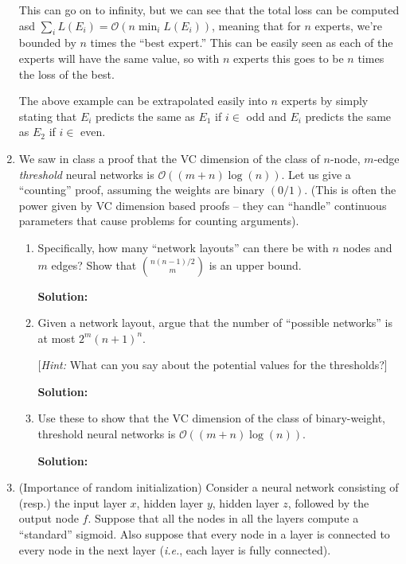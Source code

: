 \documentclass[12pt]{article}
\newcommand{\BigO}[1]{\mathcal{O}\left( #1 \right)}
\begin{document}
\begin{enumerate}
This can go on to infinity, but we can see that the total loss can be computed asd $\sum_{i}L(E_{i}) = \BigO{n \min_{i}L(E_{i})}$, meaning that for $n$ experts, we're bounded by $n$ times the ``best expert.'' This can be easily seen as each of the experts will have the same value, so with $n$ experts this goes to be $n$ times the loss of the best.

The above example can be extrapolated easily into $n$ experts by simply stating that $E_{i}$ predicts the same as $E_{1}$ if $i \in $ odd and $E_{i}$ predicts the same as $E_{2}$ if $i \in $ even.

\newpage

\item We saw in class a proof that the VC dimension of the class of $n$-node, $m$-edge {\em threshold} neural networks is $\BigO{(m+n)\log(n)}$. Let us give a ``counting'' proof, assuming the weights are binary $(0/1)$. (This is often the power given by VC dimension based proofs -- they can ``handle'' continuous parameters that cause problems for counting arguments).

\begin{enumerate}
  \item Specifically, how many ``network layouts'' can there be with $n$ nodes and $m$ edges? Show that ${n(n-1)/2}\choose{m}$ is an upper bound.

   {\bf Solution:}

   \item Given a network layout, argue that the number of ``possible networks'' is at most $2^{m}(n+1)^{n}$. 

[{\em Hint:} What can you say about the potential values for the thresholds?]

   {\bf Solution:}

\item Use these to show that the VC dimension of the class of binary-weight, threshold neural networks is $\BigO{(m+n)\log(n)}$.

   {\bf Solution:}

\end{enumerate}

\newpage

\item (Importance of random initialization) Consider a neural network consisting of (resp.) the input layer $x$, hidden layer $y$, hidden layer $z$, followed by the output node $f$. Suppose that all the nodes in all the layers compute a ``standard'' sigmoid. Also suppose that every node in a layer is connected to every node in the next layer ({\em i.e.}, each layer is fully connected).


\end{enumerate}
\end{document}
